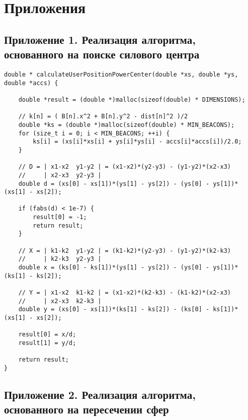 \section*{Приложения}

\lstset{basicstyle=\footnotesize \ttfamily}
\lstset{language=C, breakindent=40pt, breaklines=true}

\subsection*{Приложение 1. Реализация алгоритма, основанного на поиске силового центра}

\begin{lstlisting}
double * calculateUserPositionPowerCenter(double *xs, double *ys, double *accs) {

    double *result = (double *)malloc(sizeof(double) * DIMENSIONS);

    // k[n] = ( B[n].x^2 + B[n].y^2 - dist[n]^2 )/2
    double *ks = (double *)malloc(sizeof(double) * MIN_BEACONS);
    for (size_t i = 0; i < MIN_BEACONS; ++i) {
        ks[i] = (xs[i]*xs[i] + ys[i]*ys[i] - accs[i]*accs[i])/2.0;
    }
    
    // D = | x1-x2  y1-y2 | = (x1-x2)*(y2-y3) - (y1-y2)*(x2-x3)
    //     | x2-x3  y2-y3 |
    double d = (xs[0] - xs[1])*(ys[1] - ys[2]) - (ys[0] - ys[1])*(xs[1] - xs[2]);
    
    if (fabs(d) < 1e-7) {
        result[0] = -1;
        return result;
    }
    
    // X = | k1-k2  y1-y2 | = (k1-k2)*(y2-y3) - (y1-y2)*(k2-k3)
    //     | k2-k3  y2-y3 |
    double x = (ks[0] - ks[1])*(ys[1] - ys[2]) - (ys[0] - ys[1])*(ks[1] - ks[2]);
    
    // Y = | x1-x2  k1-k2 | = (x1-x2)*(k2-k3) - (k1-k2)*(x2-x3)
    //     | x2-x3  k2-k3 |
    double y = (xs[0] - xs[1])*(ks[1] - ks[2]) - (ks[0] - ks[1])*(xs[1] - xs[2]);
    
    result[0] = x/d;
    result[1] = y/d;
    
    return result;
}
\end{lstlisting}


\subsection*{Приложение 2. Реализация алгоритма, основанного на пересечении сфер}

